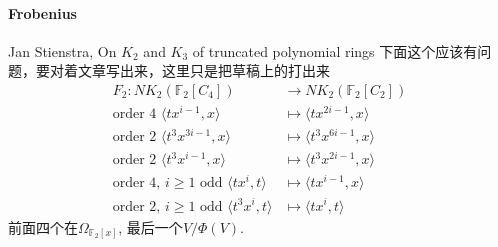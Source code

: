 \paragraph{Frobenius} %
Jan Stienstra, On $K_2$ and $K_3$ of truncated polynomial rings \cite{MR82k:13016}
下面这个应该有问题，要对着文章写出来，这里只是把草稿上的打出来
\begin{align*}
F_2 \colon  NK_2(\mathbb{F}_2[C_4]) &\longrightarrow NK_2(\mathbb{F}_2[C_2])\\
\text{order 4 } \langle tx^{i-1},x \rangle &\mapsto \langle tx^{2i-1},x \rangle\\
\text{order 2 } \langle t^3x^{3i-1},x \rangle &\mapsto \langle t^3x^{6i-1},x \rangle\\
\text{order 2 } \langle t^3x^{i-1},x \rangle &\mapsto \langle t^3x^{2i-1},x \rangle\\
\text{order 4, $i\geq 1$ odd } \langle tx^{i},t \rangle &\mapsto \langle tx^{i-1},x \rangle\\
\text{order 2, $i\geq 1$ odd } \langle t^3x^{i},t \rangle &\mapsto \langle tx^{i},t \rangle
\end{align*}
前面四个在$\Omega_{\mathbb{F}_2[x]}$, 最后一个$V/\Phi(V)$.


